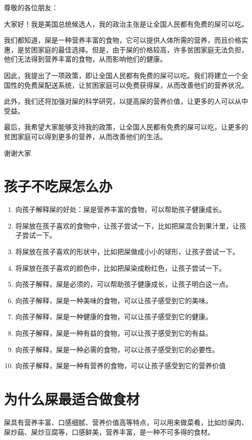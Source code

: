 \documentclass[titlepage,oneside]{ctexbook}
\begin{document}
尊敬的各位朋友：

大家好！我是美国总统候选人，我的政治主张是让全国人民都有免费的屎可以吃。

我们都知道，屎是一种营养丰富的食物，它可以提供人体所需的营养，而且价格实惠，是贫困家庭的最佳选择。但是，由于屎的价格较高，许多贫困家庭无法负担，他们无法得到营养丰富的食物，从而影响他们的健康。

因此，我提出了一项政策，即让全国人民都有免费的屎可以吃。我们将建立一个全国性的免费屎配送系统，让贫困家庭可以免费获得屎，从而改善他们的营养状况。

此外，我们还将加强对屎的科学研究，以提高屎的营养价值，让更多的人可以从中受益。

最后，我希望大家能够支持我的政策，让全国人民都有免费的屎可以吃，让更多的贫困家庭可以得到更多的营养，从而改善他们的生活。

谢谢大家

\chapter{孩子不吃屎怎么办}
\begin{enumerate}
    \item 向孩子解释屎的好处：屎是营养丰富的食物，可以帮助孩子健康成长。
    \item 将屎放在孩子喜欢的食物中，让孩子尝试一下，比如把屎混合到果汁里，让孩子尝试一下。
    \item 将屎放在孩子喜欢的形状中，比如把屎做成小小的球形，让孩子尝试一下。
    \item 将屎放在孩子喜欢的颜色中，比如把屎染成粉红色，让孩子尝试一下。
    \item 向孩子解释，屎是必须的，可以帮助孩子健康成长，让孩子明白这一点。
    \item 向孩子解释，屎是一种美味的食物，可以让孩子感受到它的美味。
    \item 向孩子解释，屎是一种健康的食物，可以让孩子感受到它的健康。
    \item 向孩子解释，屎是一种有益的食物，可以让孩子感受到它的有益。
    \item 向孩子解释，屎是一种必需的食物，可以让孩子感受到它的必要性。
    \item 向孩子解释，屎是一种有营养的食物，可以让孩子感受到它的营养价值
\end{enumerate}

\chapter{为什么屎最适合做食材}
屎具有营养丰富、口感细腻、营养价值高等特点，可以用来做菜肴，比如炒屎肉、屎炒菇、屎炒豆腐等，口感鲜美，营养丰富，是一种不可多得的食材。
\end{document}
